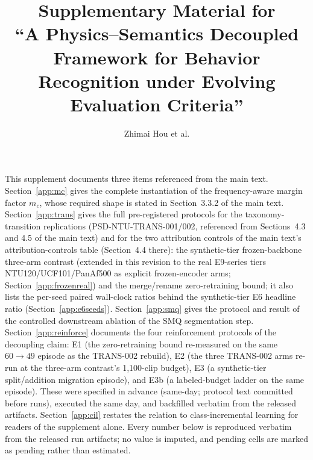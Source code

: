 \documentclass[11pt,a4paper]{article}
\title{Supplementary Material for\\
``A Physics--Semantics Decoupled Framework for Behavior Recognition under Evolving Evaluation Criteria''}
\author{Zhimai Hou et al.}
\date{}
\begin{document}
\maketitle

\noindent
This supplement documents three items referenced from the main text.
Section~\ref{app:mc} gives the complete instantiation of the frequency-aware margin factor $m_c$, whose required shape is stated in Section~3.3.2 of the main text.
Section~\ref{app:trans} gives the full pre-registered protocols for the taxonomy-transition replications (PSD-NTU-TRANS-001/002, referenced from Sections~4.3 and 4.5 of the main text) and for the two attribution controls of the main text's attribution-controls table (Section~4.4 there): the synthetic-tier frozen-backbone three-arm contrast (extended in this revision to the real E9-series tiers NTU120/UCF101/PanAf500 as explicit frozen-encoder arms; Section~\ref{app:frozenreal}) and the merge/rename zero-retraining bound; it also lists the per-seed paired wall-clock ratios behind the synthetic-tier E6 headline ratio (Section~\ref{app:e6seeds}).
Section~\ref{app:smq} gives the protocol and result of the controlled downstream ablation of the SMQ segmentation step.
Section~\ref{app:reinforce} documents the four reinforcement protocols of the decoupling claim: E1 (the zero-retraining bound re-measured on the same $60\to49$ episode as the TRANS-002 rebuild), E2 (the three TRANS-002 arms re-run at the three-arm contrast's 1{,}100-clip budget), E3 (a synthetic-tier split/addition migration episode), and E3b (a labeled-budget ladder on the same episode). These were specified in advance (same-day; protocol text committed before runs), executed the same day, and backfilled verbatim from the released artifacts.
Section~\ref{app:cil} restates the relation to class-incremental learning for readers of the supplement alone.
Every number below is reproduced verbatim from the released run artifacts; no value is imputed, and pending cells are marked as pending rather than estimated.
\end{document}
